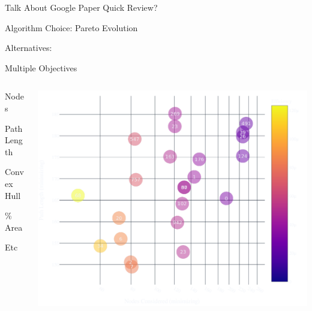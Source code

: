 \documentclass[aspectratio=169]{beamer}
\makeatletter
\renewcommand{\emph}[1]{{\Huge \color{pureminimalistic@text@red} #1}}
\renewcommand{\white}[1]{{\color{pureminimalistic@text@white} #1}}
\renewcommand{\red}[1]{{\color{pureminimalistic@text@red} #1}}
\makeatother
\begin{document}
\begin{frame}{Talk About Google Paper}
    \centering
    \vfill
    {\fontsize{40}{50}\selectfont Quick Review?}
    \vfill
\end{frame}

\begin{frame}{\white{Algorithm Choice:} \red{Pareto Evolution}}
    \begin{vfilleditems}
        \item \emph{Alternatives:}
    \end{vfilleditems}
\end{frame}

\begin{frame}{{\color{pureminimalistic@text@white} Multiple Objectives}}
  \begin{columns}[T]
      \begin{column}{.4\linewidth}
          \begin{vfilleditems}
              \item \emph{Nodes}
              \vspace{1em}
              \item \emph{Path Length}
              \vspace{1em}
              \item {\Huge Convex Hull}
              \vspace{1em}
              \item {\Huge \% Area}
              \vspace{1em}
              \item {\Huge Etc}
          \end{vfilleditems}
      \end{column}
      \begin{column}{.6\linewidth}
      \includegraphics[width=0.9\linewidth, keepaspectratio]{figures/total_overview.pdf}
      \end{column}
  \end{columns}
\end{frame}
\end{document}
